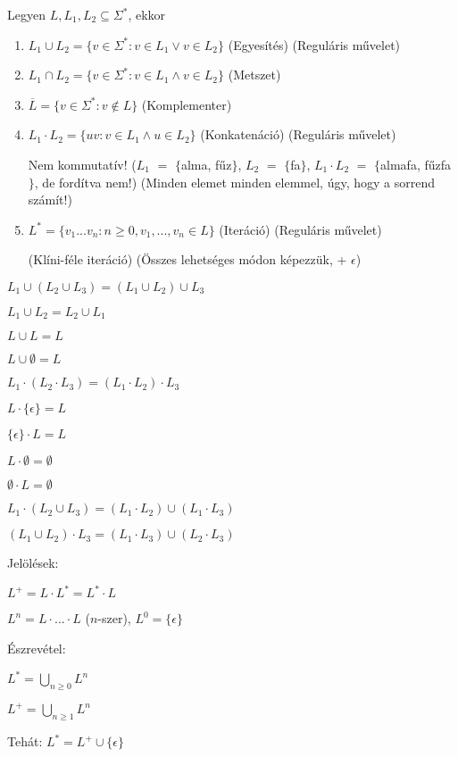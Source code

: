 \documentclass[10pt]{article}
\renewcommand{\\}{\par\noindent}
\begin{document}
\begin{frame}
\begin{tcolorbox}[squeezed title={Def.: Egyesítés,Metszet, Komplementer, Konkatenáció, Iteráció}]
Legyen $L, L_1, L_2 \subseteq {\Sigma}^*$, ekkor\\
\medskip
\begin{enumerate}
\item $L_1 \cup L_2 = \{v \in {\Sigma}^* : v \in L_1 \lor v \in L_2\}$ (Egyesítés) (Reguláris művelet)
\item $L_1 \cap L_2 = \{v \in {\Sigma}^* : v \in L_1 \land v \in L_2\}$ (Metszet)
\item $\overline{L} = \{v \in {\Sigma}^* : v \notin L\}$ (Komplementer)
\item $L_1 \cdot  L_2 = \{uv : v \in L_1 \land u \in L_2\}$ (Konkatenáció) (Reguláris művelet)\\
Nem kommutatív! ($L_1$ $=$ $\{$alma, fűz$\}$, $L_2$ $=$ $\{$fa$\}$, $L_1 \cdot L_2$ $=$ $\{$almafa, fűzfa$\}$, de fordítva nem!) (Minden elemet minden elemmel, úgy, hogy a sorrend számít!)
\item $L^* = \{v_1...v_n : n \geq 0, v_1, ..., v_n \in L\}$ (Iteráció) (Reguláris művelet)\\
(Klíni-féle iteráció) (Összes lehetséges módon képezzük, + $\epsilon$)
\end{enumerate}
\end{tcolorbox}

\end{frame}

\begin{frame}
\begin{tcolorbox}[title={Műveleti azonosságok}]
$L_1 \cup (L_2 \cup L_3) = (L_1 \cup L_2) \cup L_3$\\
$L_1 \cup L_2 = L_2  \cup L_1$\\
$L \cup L = L$\\
$L \cup \emptyset = L$\\
\bigskip
$L_1 \cdot (L_2 \cdot L_3) = (L_1 \cdot L_2) \cdot L_3$\\
$L \cdot \{{\epsilon}\} = L$\\
$\{{\epsilon}\} \cdot L = L$\\
$L \cdot \emptyset = \emptyset$\\
$\emptyset \cdot L = \emptyset$\\
\bigskip
$L_1 \cdot (L_2 \cup L_3) = (L_1 \cdot L_2) \cup (L_1 \cdot L_3)$\\
$(L_1 \cup L_2) \cdot L_3 = (L_1 \cdot L_3) \cup (L_2 \cdot L_3)$\\
\bigskip
Jelölések:\\
\medskip
$L^+ = L \cdot L^* = L^* \cdot L$\\
$L^n = L \cdot ... \cdot L$ ($n$-szer), $L^0 = \{{\epsilon}\}$\\
\medskip
Észrevétel:\\
\medskip
$L^* = \bigcup_{n \geq 0} L^n$\\
$L^+ = \bigcup_{n \geq 1} L^n$\\
\smallskip
Tehát: $L^* = L^+ \cup \{{\epsilon}\}$
\end{tcolorbox}

\end{frame}
\end{document}
